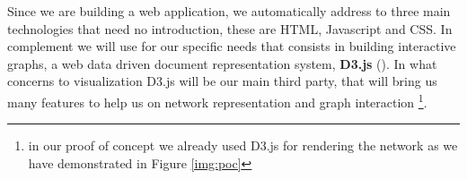 Since we are building a web application, we automatically address to three main technologies that need no introduction, these are HTML, Javascript and CSS. In complement we will use for our specific needs that consists in building interactive graphs, a web data driven document representation system, \textbf{D3.js} (\cite{bostock2012d3}). In what concerns to visualization D3.js will be our main third party, that will bring us many features to help us on network representation and graph interaction \footnote{in our proof of concept we already used D3.js for rendering the network as we have demonstrated in Figure \ref{img:poc}}.
%
%
